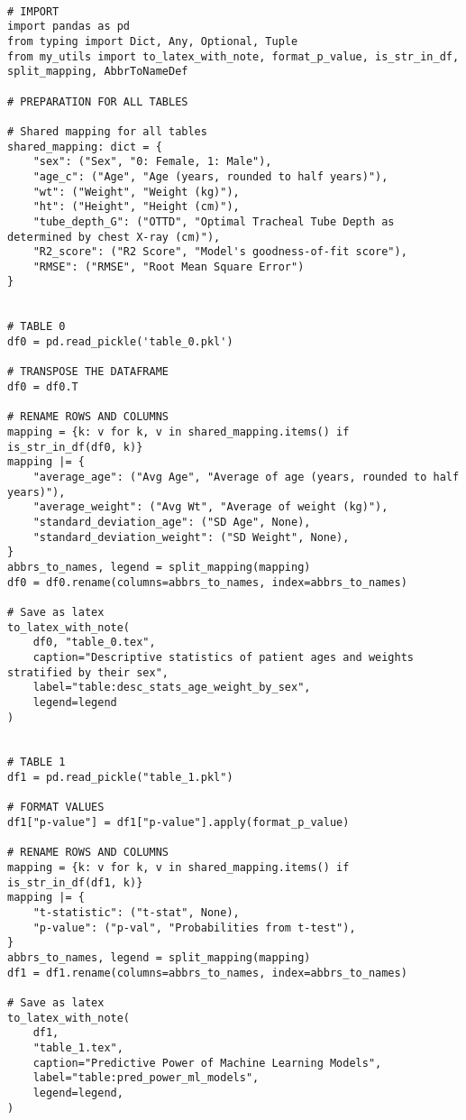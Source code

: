 \documentclass[11pt]{article}
\begin{document}
\begin{verbatim}

# IMPORT
import pandas as pd
from typing import Dict, Any, Optional, Tuple
from my_utils import to_latex_with_note, format_p_value, is_str_in_df, split_mapping, AbbrToNameDef

# PREPARATION FOR ALL TABLES

# Shared mapping for all tables
shared_mapping: dict = {
    "sex": ("Sex", "0: Female, 1: Male"),
    "age_c": ("Age", "Age (years, rounded to half years)"),
    "wt": ("Weight", "Weight (kg)"),
    "ht": ("Height", "Height (cm)"),
    "tube_depth_G": ("OTTD", "Optimal Tracheal Tube Depth as determined by chest X-ray (cm)"),
    "R2_score": ("R2 Score", "Model's goodness-of-fit score"),
    "RMSE": ("RMSE", "Root Mean Square Error")
}


# TABLE 0
df0 = pd.read_pickle('table_0.pkl')

# TRANSPOSE THE DATAFRAME
df0 = df0.T

# RENAME ROWS AND COLUMNS
mapping = {k: v for k, v in shared_mapping.items() if is_str_in_df(df0, k)} 
mapping |= {
    "average_age": ("Avg Age", "Average of age (years, rounded to half years)"),
    "average_weight": ("Avg Wt", "Average of weight (kg)"),
    "standard_deviation_age": ("SD Age", None),
    "standard_deviation_weight": ("SD Weight", None),
}
abbrs_to_names, legend = split_mapping(mapping)
df0 = df0.rename(columns=abbrs_to_names, index=abbrs_to_names)

# Save as latex
to_latex_with_note(
    df0, "table_0.tex",
    caption="Descriptive statistics of patient ages and weights stratified by their sex",
    label="table:desc_stats_age_weight_by_sex",
    legend=legend
) 


# TABLE 1
df1 = pd.read_pickle("table_1.pkl") 

# FORMAT VALUES
df1["p-value"] = df1["p-value"].apply(format_p_value)

# RENAME ROWS AND COLUMNS
mapping = {k: v for k, v in shared_mapping.items() if is_str_in_df(df1, k)}
mapping |= {
    "t-statistic": ("t-stat", None),
    "p-value": ("p-val", "Probabilities from t-test"),
}
abbrs_to_names, legend = split_mapping(mapping)
df1 = df1.rename(columns=abbrs_to_names, index=abbrs_to_names)

# Save as latex
to_latex_with_note(
    df1,
    "table_1.tex",
    caption="Predictive Power of Machine Learning Models",
    label="table:pred_power_ml_models",
    legend=legend,
)

\end{verbatim}
\end{document}
